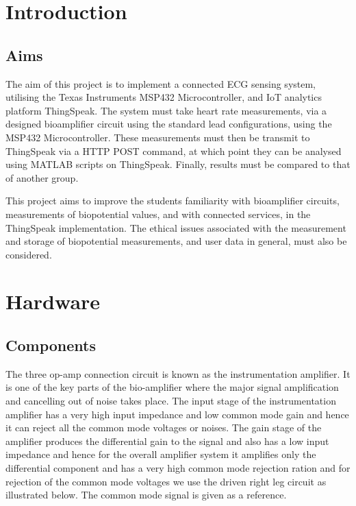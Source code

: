 \documentclass[11pt,a4paper,headinclude=false,footinclude=false]{scrreprt}
\begin{document}


\setcounter{secnumdepth}{1}
\setcounter{tocdepth}{1}
\tableofcontents
\listoffigures
\hypertarget{introduction}{%
\chapter{Introduction}\label{introduction}}

\hypertarget{aims}{%
\section{Aims}\label{aims}}

The aim of this project is to implement a connected ECG sensing system,
utilising the Texas Instruments MSP432 Microcontroller, and IoT
analytics platform ThingSpeak. The system must take heart rate
measurements, via a designed bioamplifier circuit using the standard
lead configurations, using the MSP432 Microcontroller. These
measurements must then be transmit to ThingSpeak via a HTTP POST
command, at which point they can be analysed using MATLAB scripts on
ThingSpeak. Finally, results must be compared to that of another group.

This project aims to improve the students familiarity with bioamplifier
circuits, measurements of biopotential values, and with connected
services, in the ThingSpeak implementation. The ethical issues
associated with the measurement and storage of biopotential
measurements, and user data in general, must also be considered.

\hypertarget{hardware}{%
\chapter{Hardware}\label{hardware}}

\hypertarget{components}{%
\section{Components}\label{components}}

The three op-amp connection circuit is known as the instrumentation
amplifier. It is one of the key parts of the bio-amplifier where the
major signal amplification and cancelling out of noise takes place. The
input stage of the instrumentation amplifier has a very high input
impedance and low common mode gain and hence it can reject all the
common mode voltages or noises\cite{BioAmp}. The gain stage of the
amplifier produces the differential gain to the signal and also has a
low input impedance and hence for the overall amplifier system it
amplifies only the differential component and has a very high common
mode rejection ration and for rejection of the common mode voltages we
use the driven right leg circuit as illustrated below. The common mode
signal is given as a reference.
\end{document}
